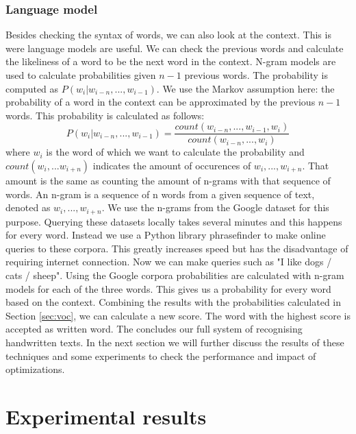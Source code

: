 \documentclass{article}
\begin{document}
\subsubsection{Language model}
\label{sec:lm}
Besides checking the syntax of words, we can also look at the context. This is were language models are useful. We can check the previous words and calculate the likeliness of a word to be the next word in the context. N-gram models are used to calculate probabilities given $n-1$ previous words. The probability is computed as $P(w_i | w_{i-n},...,w_{i-1})$. 
We use the Markov assumption here: the probability of a word in the context can be approximated by the previous $n-1$ words. \cite{markov} This probability is calculated as follows: 
\begin{equation}
        P(w_i | w_{i-n},...,w_{i-1}) = \frac{count(w_{i-n},...,w_{i-1},w_{i})}{count(w_{i-n},...,w_i)}
\end{equation}
where $w_i$ is the word of which we want to calculate the probability and $count(w_i,...w_{i+n})$ indicates the amount of occurences of $w_i,...,w_{i+n}$. That amount is the same as counting the amount of n-grams with that sequence of words. An n-gram is a sequence of n words from a given sequence of text, denoted as $w_i,...,w_{i+n}$. \cite{ngrams} %
We use the n-grams from the Google dataset for this purpose. \cite{google} Querying these datasets locally takes several minutes and this happens for every word. Instead we use a Python library phrasefinder to make online queries to these corpora. This greatly increases speed but has the disadvantage of requiring internet connection. 
Now we can make queries such as "I like dogs / cats / sheep". Using the Google corpora probabilities are calculated with n-gram models for each of the three words. This gives us a probability for every word based on the context. 
Combining the results with the probabilities calculated in Section \ref{sec:voc}, we can 
calculate a new score. The word with the highest score is accepted as written word. 
The concludes our full system of recognising handwritten texts. In the next section we will further discuss the results of these techniques and some experiments to check the performance and impact of optimizations. 
\section{Experimental results}
\end{document}
